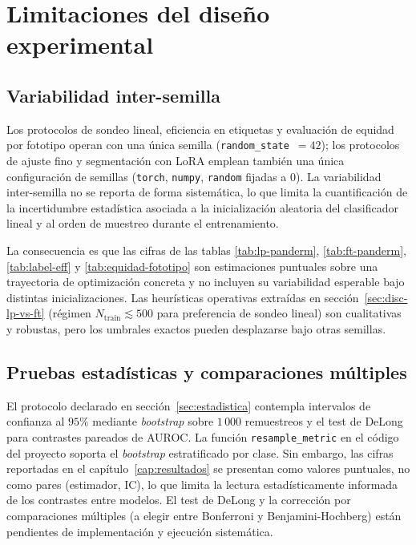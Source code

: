 \section{Limitaciones del diseño experimental}
\label{sec:lim-diseno}

\subsection{Variabilidad inter-semilla}
\label{sec:lim-semilla}

Los protocolos de sondeo lineal, eficiencia en etiquetas y
evaluación de equidad por fototipo operan con una única semilla
(\texttt{random\_state}~$=42$); los protocolos de ajuste fino y
segmentación con LoRA emplean también una única configuración de
semillas (\texttt{torch}, \texttt{numpy}, \texttt{random} fijadas a
$0$). La variabilidad inter-semilla no se reporta de forma
sistemática, lo que limita la cuantificación de la incertidumbre
estadística asociada a la inicialización aleatoria del clasificador
lineal y al orden de muestreo durante el entrenamiento.

La consecuencia es que las cifras de las tablas
\ref{tab:lp-panderm}, \ref{tab:ft-panderm}, \ref{tab:label-eff} y
\ref{tab:equidad-fototipo} son estimaciones puntuales sobre una
trayectoria de optimización concreta y no incluyen su variabilidad
esperable bajo distintas inicializaciones. Las heurísticas
operativas extraídas en secci\'on~\ref{sec:disc-lp-vs-ft}
(régimen $N_{\mathrm{train}} \lesssim 500$ para preferencia de
sondeo lineal) son cualitativas y robustas, pero los umbrales
exactos pueden desplazarse bajo otras semillas.

\subsection{Pruebas estadísticas y comparaciones múltiples}
\label{sec:lim-estadistica}

El protocolo declarado en secci\'on~\ref{sec:estadistica} contempla
intervalos de confianza al $95\%$ mediante \emph{bootstrap} sobre
$1\,000$ remuestreos y el test de DeLong~\cite{delong1988} para
contrastes pareados de AUROC. La función \texttt{resample\_metric}
en el código del proyecto soporta el \emph{bootstrap} estratificado
por clase. Sin embargo, las cifras reportadas en el
capítulo~\ref{cap:resultados} se presentan como valores puntuales,
no como pares (estimador, IC), lo que limita la lectura
estadísticamente informada de los contrastes entre modelos. El
test de DeLong y la corrección por comparaciones múltiples (a
elegir entre Bonferroni y Benjamini-Hochberg) están pendientes de
implementación y ejecución sistemática.

